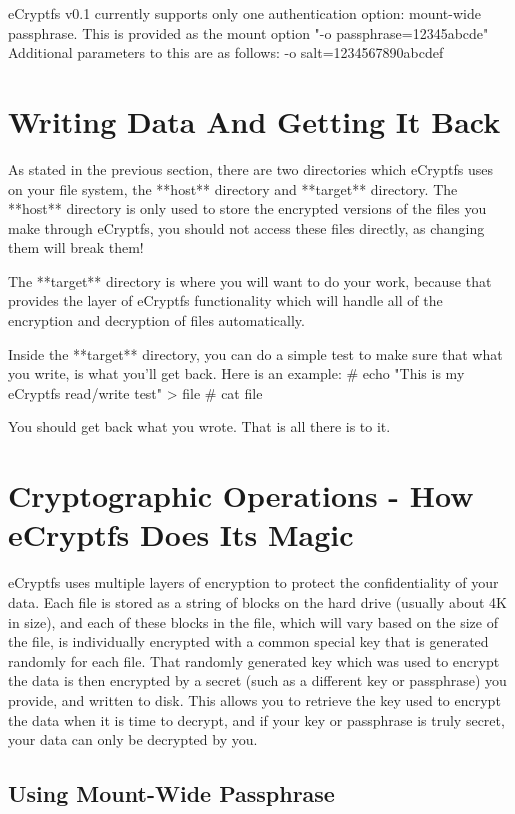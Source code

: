 \documentclass{article}
\begin{document}
eCryptfs v0.1 currently supports only one authentication option: mount-wide
passphrase. This is provided as the mount option "-o passphrase=12345abcde"
Additional parameters to this are as follows:
-o salt=1234567890abcdef

\section*{Writing Data And Getting It Back}

As stated in the previous section, there are two directories which eCryptfs
uses on your file system, the **host** directory and **target** directory.
The **host** directory is only used to store the encrypted versions of the
files you make through eCryptfs, you should not access these files directly,
as changing them will break them!

The **target** directory is where you will want to do your work, because that
provides the layer of eCryptfs functionality which will handle all of the
encryption and decryption of files automatically.

Inside the **target** directory, you can do a simple test to make sure that
what you write, is what you'll get back. Here is an example:
\# echo "This is my eCryptfs read/write test" > file
\# cat file

You should get back what you wrote. That is all there is to it.

\section*{Cryptographic Operations - How eCryptfs Does Its Magic}

eCryptfs uses multiple layers of encryption to protect the confidentiality of
your data. Each file is stored as a string of blocks on the hard drive (usually about 4K in size), and each of these blocks in the file, which will vary
based on the size of the file, is individually encrypted with a common special
key that is generated randomly for each file. That randomly generated key
which was used to encrypt the data is then encrypted by a secret (such as a
different key or passphrase) you provide, and written to disk. This allows
you to retrieve the key used to encrypt the data when it is time to decrypt,
and if your key or passphrase is truly secret, your data can only be
decrypted by you.

\subsection*{Using Mount-Wide Passphrase}
\end{document}
